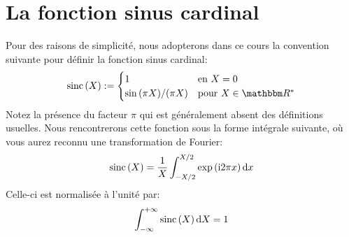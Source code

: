 \section{La fonction sinus cardinal}
\label{sinc}

Pour des raisons de simplicité,
nous adopterons dans ce cours la convention suivante pour définir la fonction sinus cardinal:
\begin{equation*}
\sinc{X} \eqdef \begin{cases}
1 & \text{en $X = 0$} \\
\sin{( \pi X )} / ( \pi X ) & \text{pour $X \in \IR^*$}
\end{cases}
\end{equation*}
Notez la présence du facteur $\pi$ qui est généralement absent des définitions usuelles.
Nous rencontrerons cette fonction sous la forme intégrale suivante,
où vous aurez reconnu une transformation de Fourier:
\begin{equation*}
\mathrm{sinc} \left( {X} \right) = \frac 1 X \int_{-X/2}^{X/2} \mathrm{exp} \left( {\mathrm{i} 2 \pi x} \right) \mathrm dx
\end{equation*}
Celle-ci est normalisée à l'unité par:
\begin{equation*}
\int_{-\infty}^{+\infty} \mathrm{sinc} \left( {X} \right) \mathrm dX = 1
\end{equation*}
